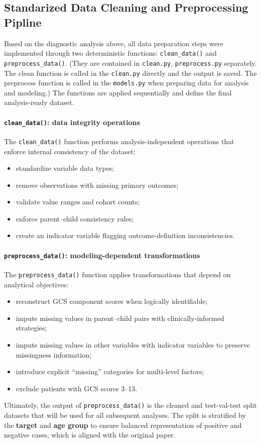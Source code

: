 \documentclass[10pt,letterpaper]{article}
\begin{document}
\subsection{ Standarized Data Cleaning and Preprocessing Pipline}

Based on the diagnostic analysis above, all data preparation steps were
implemented through two deterministic functions:
\texttt{clean\_data()} and \texttt{preprocess\_data()}. (They are contained in \texttt{clean.py}, \texttt{preprocess.py} separately. The clean function is called in the \texttt{clean.py} directly and the output is saved. The preprocess function is called in the \texttt{models.py} when preparing data for analysis and modeling.)
The functions are applied sequentially and define the final analysis-ready dataset.


\paragraph{\texttt{clean\_data()}: data integrity operations}

The \texttt{clean\_data()} function performs analysis-independent
operations that enforce internal consistency of the dataset:

\begin{itemize}
\item standardize variable data types;
\item remove observations with missing primary outcomes;
\item validate value ranges and cohort counts;
\item enforce parent--child consistency rules;
\item create an indicator variable flagging outcome-definition inconsistencies.
\end{itemize}

\paragraph{\texttt{preprocess\_data()}: modeling-dependent transformations}

The \texttt{preprocess\_data()} function applies transformations that
depend on analytical objectives:

\begin{itemize}
\item reconstruct GCS component scores when logically identifiable;
\item impute missing values in parent--child pairs with clinically-informed strategies;
\item impute missing values in other variables with indicator variables to preserve missingness information;
\item introduce explicit ``missing'' categories for multi-level factors;
\item exclude patients with GCS scores 3--13.
\end{itemize}
Ultimately, the output of \texttt{preprocess\_data()} is the cleaned and test-val-test split datasets that will be used for all subsequent analyses. The split is stratified by the \textbf{target} and \textbf{age group} to ensure balanced representation of positive and negative cases, which is aligned with the original paper.
\end{document}
